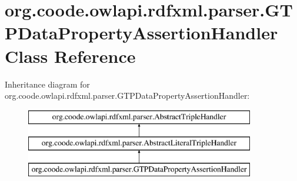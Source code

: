 \hypertarget{classorg_1_1coode_1_1owlapi_1_1rdfxml_1_1parser_1_1_g_t_p_data_property_assertion_handler}{\section{org.\-coode.\-owlapi.\-rdfxml.\-parser.\-G\-T\-P\-Data\-Property\-Assertion\-Handler Class Reference}
\label{classorg_1_1coode_1_1owlapi_1_1rdfxml_1_1parser_1_1_g_t_p_data_property_assertion_handler}
}
Inheritance diagram for org.\-coode.\-owlapi.\-rdfxml.\-parser.\-G\-T\-P\-Data\-Property\-Assertion\-Handler\-:\begin{figure}[H]
\begin{center}
\leavevmode
\includegraphics[height=3.000000cm]{classorg_1_1coode_1_1owlapi_1_1rdfxml_1_1parser_1_1_g_t_p_data_property_assertion_handler}
\end{center}
\end{figure}

